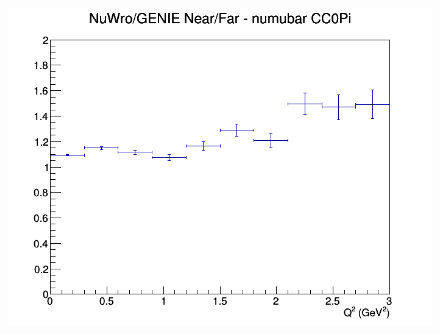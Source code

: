 \documentclass[12pt]{article}
\begin{document}
\begin{figure}[h]
\endminipage
{}
\includegraphics[width=\linewidth]{eff_Q2/FGT/ratios/CC0Pi_NuWro_GENIE_numubar_NF_Q2.png}
\endminipage
\newline
\end{figure}
\clearpage
\end{document}
